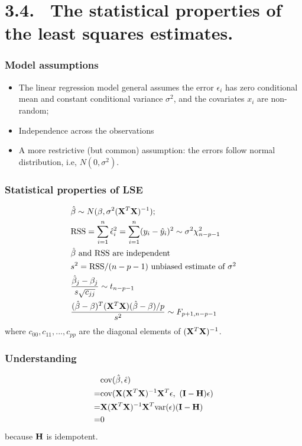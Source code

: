 \documentclass{beamer}
\begin{document}
      \section{3.4. \ The statistical properties of the least squares estimates.}
      
      \begin{frame}
      	\frametitle{Model assumptions}
      	
      	\begin{itemize}
      		\item 
      		The linear regression model general assumes
      		the error $\epsilon_i$ has zero conditional mean and constant conditional
      		variance $\sigma^2$, and the covariates $x_i$ are non-random;
      		\item Independence across the observations
      		\item  A more restrictive (but common) assumption:  the errors
      		follow normal distribution, i.e, $N(0, \sigma^2)$.
      	\end{itemize}
      	
      \end{frame}
      
      \begin{frame}
      	\frametitle{Statistical properties of LSE }
      	
      	\begin{eqnarray*}
      		&\hat {\bf \beta} \sim N({\bf \beta}, \sigma^2 ({\bf X}^T {\bf X})^{-1}); \\
      		&\hbox{RSS} = \sum_{i=1}^n \hat \epsilon_i^2 = \sum_{i=1}^n (y_i - \hat y_i)^2
      		\sim \sigma^2 \chi^2_{n-p-1} \\
      		&\hat {\bf \beta} \hbox{ and RSS are independent} \\
      		&s^2 = \hbox{RSS}/(n-p-1) \hbox{ unbiased estimate of $\sigma^2$} \\
      		&{\hat \beta_j - \beta_j \over s \sqrt{c_{jj}} } \sim t_{n-p-1} \\
      		& { (\hat {\bf \beta} - {\bf \beta})^T({\bf X}^T { \bf X})   (\hat {\bf \beta} - {\bf \beta})/p
      			\over   s^2  } \sim F_{p+1, n-p-1}
      	\end{eqnarray*}
      	where $c_{00}, c_{11}, ..., c_{pp}$ are the diagonal elements of
      	$({\bf X}^T{\bf X})^{-1}$.
      \end{frame}
      
      \begin{frame}
      	\frametitle{Understanding}
      	\begin{eqnarray*}
      		& \hbox{cov}(\hat {\bf \beta}, \hat {\bf \epsilon}) \\
      		=&
      		\hbox{cov} ({\bf X}({\bf X}^T{\bf X})^{-1} {\bf X}^T {\bf \epsilon}, \,\,  ({\bf I} - {\bf H}) {\bf \epsilon})
      		\\
      		=& {\bf X}({\bf X}^T{\bf X})^{-1} {\bf X}^T \hbox{var}({\bf \epsilon})({\bf I} - {\bf H})
      		\\
      		= & 0
      	\end{eqnarray*}
      	because ${\bf H}$ is idempotent.
      \end{frame}
      
\end{document}
